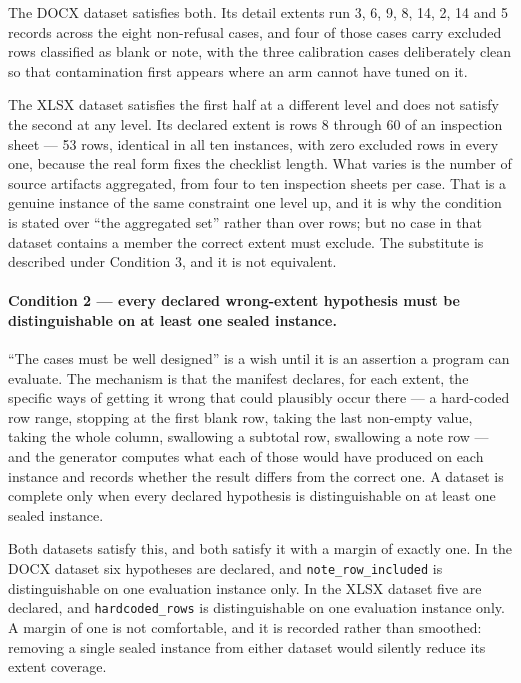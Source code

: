 The DOCX dataset satisfies both. Its detail extents run 3, 6, 9, 8, 14, 2, 14 and 5 records
across the eight non-refusal cases, and four of those cases carry excluded rows classified as
blank or note, with the three calibration cases deliberately clean so that contamination first
appears where an arm cannot have tuned on it.

The XLSX dataset satisfies the first half at a different level and does not satisfy the second
at any level. Its declared extent is rows 8 through 60 of an inspection sheet --- 53 rows,
identical in all ten instances, with zero excluded rows in every one, because the real form
fixes the checklist length. What varies is the number of source artifacts aggregated, from four
to ten inspection sheets per case. That is a genuine instance of the same constraint one level
up, and it is why the condition is stated over ``the aggregated set'' rather than over rows;
but no case in that dataset contains a member the correct extent must exclude. The substitute
is described under Condition 3, and it is not equivalent.

\paragraph{Condition 2 --- every declared wrong-extent hypothesis must be distinguishable on at
least one sealed instance.}
``The cases must be well designed'' is a wish until it is an assertion a program can evaluate.
The mechanism is that the manifest declares, for each extent, the specific ways of getting it
wrong that could plausibly occur there --- a hard-coded row range, stopping at the first blank
row, taking the last non-empty value, taking the whole column, swallowing a subtotal row,
swallowing a note row --- and the generator computes what each of those would have produced on
each instance and records whether the result differs from the correct one. A dataset is
complete only when every declared hypothesis is distinguishable on at least one sealed
instance.

Both datasets satisfy this, and both satisfy it with a margin of exactly one. In the DOCX
dataset six hypotheses are declared, and \texttt{note\_row\_included} is distinguishable on one
evaluation instance only. In the XLSX dataset five are declared, and \texttt{hardcoded\_rows}
is distinguishable on one evaluation instance only. A margin of one is not comfortable, and it
is recorded rather than smoothed: removing a single sealed instance from either dataset would
silently reduce its extent coverage.

